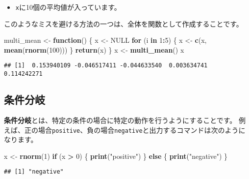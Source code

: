 \documentclass[]{bxjsarticle}
\newenvironment{Shaded}{\begin{snugshade}}{\end{snugshade}}
\newcommand{\ControlFlowTok}[1]{\textcolor[rgb]{0.13,0.29,0.53}{\textbf{#1}}}
\newcommand{\DecValTok}[1]{\textcolor[rgb]{0.00,0.00,0.81}{#1}}
\newcommand{\KeywordTok}[1]{\textcolor[rgb]{0.13,0.29,0.53}{\textbf{#1}}}
\newcommand{\NormalTok}[1]{#1}
\newcommand{\OperatorTok}[1]{\textcolor[rgb]{0.81,0.36,0.00}{\textbf{#1}}}
\newcommand{\OtherTok}[1]{\textcolor[rgb]{0.56,0.35,0.01}{#1}}
\newcommand{\StringTok}[1]{\textcolor[rgb]{0.31,0.60,0.02}{#1}}
\providecommand{\tightlist}{%
  \setlength{\itemsep}{0pt}\setlength{\parskip}{0pt}}
\begin{document}
\begin{itemize}
\tightlist
\item
  \texttt{x}に10個の平均値が入っています。
\end{itemize}

このようなミスを避ける方法の一つは、全体を関数として作成することです。

\begin{Shaded}
\begin{Highlighting}[]
\NormalTok{multi_mean <-}\StringTok{ }\ControlFlowTok{function}\NormalTok{() \{}
\NormalTok{  x <-}\StringTok{ }\OtherTok{NULL}
  \ControlFlowTok{for}\NormalTok{ (i }\ControlFlowTok{in} \DecValTok{1}\OperatorTok{:}\DecValTok{5}\NormalTok{) \{}
\NormalTok{    x <-}\StringTok{ }\KeywordTok{c}\NormalTok{(x, }\KeywordTok{mean}\NormalTok{(}\KeywordTok{rnorm}\NormalTok{(}\DecValTok{100}\NormalTok{)))}
\NormalTok{  \}}
  \KeywordTok{return}\NormalTok{(x)}
\NormalTok{\}}
\NormalTok{x <-}\StringTok{ }\KeywordTok{multi_mean}\NormalTok{()}
\NormalTok{x}
\end{Highlighting}
\end{Shaded}

\begin{verbatim}
## [1]  0.153940109 -0.046517411 -0.044633540  0.003634741  0.114242271
\end{verbatim}

\hypertarget{ux6761ux4ef6ux5206ux5c90}{%
\subsection{条件分岐}\label{ux6761ux4ef6ux5206ux5c90}}

\textbf{条件分岐}とは、特定の条件の場合に特定の動作を行うようにすることです。
例えば、正の場合\texttt{positive}、負の場合\texttt{negative}と出力するコマンドは次のようになります。

\begin{Shaded}
\begin{Highlighting}[]
\NormalTok{x <-}\StringTok{ }\KeywordTok{rnorm}\NormalTok{(}\DecValTok{1}\NormalTok{)}
\ControlFlowTok{if}\NormalTok{ (x }\OperatorTok{>}\StringTok{ }\DecValTok{0}\NormalTok{) \{}
  \KeywordTok{print}\NormalTok{(}\StringTok{"positive"}\NormalTok{)}
\NormalTok{\} }\ControlFlowTok{else}\NormalTok{ \{}
  \KeywordTok{print}\NormalTok{(}\StringTok{"negative"}\NormalTok{)}
\NormalTok{\}}
\end{Highlighting}
\end{Shaded}

\begin{verbatim}
## [1] "negative"
\end{verbatim}
\end{document}
